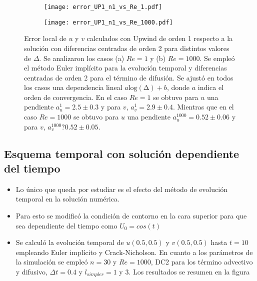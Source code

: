 \documentclass[aps,prb,twocolumn,superscriptaddress,floatfix,longbibliography,10pt]{revtex4-2}
\newcounter{para}
\begin{document}
\begin{figure}
  \centering
  \begin{subfigure}[b]{0.3\textwidth}
      \centering
      \texttt{[image: error\_UP1\_n1\_vs\_Re\_1.pdf]}
      \caption{}
      \label{fig:error_UP1_n1_vs_Re_1}
  \end{subfigure}
  \hfill
  \begin{subfigure}[b]{0.3\textwidth}
      \centering
      \texttt{[image: error\_UP1\_n1\_vs\_Re\_1000.pdf]}
      \caption{}
      \label{fig:error_UP1_n1_vs_Re_1000}
  \end{subfigure}
     \caption{Error local de $u$ y $v$ calculados con Upwind de orden 1 respecto a la solución con diferencias centradas de orden 2 para distintos valores de $\Delta$. Se analizaron los casos (a) $Re = 1$ y (b) $Re = 1000$. Se empleó el método Euler implícito para la evolución temporal y diferencias centradas de orden 2 para el término de difusión. Se ajustó en todos los casos una dependencia lineal $a \mathrm{log(\Delta)} + b$, donde $a$ indica el orden de convergencia. En el caso $Re = 1$ se obtuvo para $u$ una pendiente $a_{u}^1 = 2.5 \pm 0.3$ y para $v$, $a_{v}^1 = 2.9 \pm 0.4$. Mientras que en el caso $Re = 1000$ se obtuvo para $u$ una pendiente $a_u^1000 = 0.52 \pm 0.06$ y para $v$, $a_v^1000 ? 0.52 \pm 0.05$.
     }
     \label{fig:error_UP1_n1_vs_Re}
\end{figure}





\subsection{Esquema temporal con solución dependiente del tiempo}
\begin{itemize}
  \item Lo único que queda por estudiar es el efecto del método de evolución temporal en la solución numérica.
  \item Para esto se modificó la condición de contorno en la cara superior para que sea dependiente del tiempo como $U_0 = cos(t)$
  \item Se calculó la evolución temporal de $u(0.5,0.5)$ y $v(0.5,0.5)$ hasta $t = 10$ empleando Euler implícito y Crack-Nicholson. En cuanto a los parámetros de la simulación se empleó $n = 30$ y $Re = 1000$, DC2 para los término advectivo y difusivo, $\Delta t = 0.4$ y $l_{simpler} = 1$ y $3$. Los resultados se resumen en la figura

\end{itemize}
\end{document}
